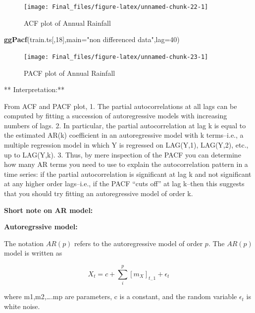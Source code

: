 \documentclass[12pt,openany]{book}
\newenvironment{Shaded}{\begin{snugshade}}{\end{snugshade}}
\newcommand{\DataTypeTok}[1]{\textcolor[rgb]{0.13,0.29,0.53}{#1}}
\newcommand{\DecValTok}[1]{\textcolor[rgb]{0.00,0.00,0.81}{#1}}
\newcommand{\KeywordTok}[1]{\textcolor[rgb]{0.13,0.29,0.53}{\textbf{#1}}}
\newcommand{\NormalTok}[1]{#1}
\newcommand{\StringTok}[1]{\textcolor[rgb]{0.31,0.60,0.02}{#1}}
\begin{document}
\begin{figure}

{\centering \texttt{[image: Final\_files/figure-latex/unnamed-chunk-22-1]} 

}

\caption{ACF plot of Annual Rainfall}\label{fig:unnamed-chunk-22}
\end{figure}

\begin{Shaded}
\begin{Highlighting}[]
\KeywordTok{ggPacf}\NormalTok{(train.ts[,}\DecValTok{18}\NormalTok{],}\DataTypeTok{main=}\StringTok{"non differenced data"}\NormalTok{,}\DataTypeTok{lag=}\DecValTok{40}\NormalTok{)}
\end{Highlighting}
\end{Shaded}

\begin{figure}

{\centering \texttt{[image: Final\_files/figure-latex/unnamed-chunk-23-1]} 

}

\caption{PACF plot of Annual Rainfall}\label{fig:unnamed-chunk-23}
\end{figure}

** Interpretation:**

From ACF and PACF plot,
1. The partial autocorrelations at all lags can be computed by fitting a succession of autoregressive models with increasing numbers of lags.
2. In particular, the partial autocorrelation at lag k is equal to the estimated AR(k) coefficient in an autoregressive model with k terms--i.e., a multiple regression model in which Y is regressed on LAG(Y,1), LAG(Y,2), etc., up to LAG(Y,k).
3. Thus, by mere inspection of the PACF you can determine how many AR terms you need to use to explain the autocorrelation pattern in a time series: if the partial autocorrelation is significant at lag k and not significant at any higher order lags--i.e., if the PACF ``cuts off'' at lag k--then this suggests that you should try fitting an autoregressive model of order k.

\textbf{Short note on AR model:}

\textbf{Autoregrssive model:}

The notation \(AR(p)\) refers to the autoregressive model of order \(p\). The \(AR(p)\) model is written as

\[X_t  = c + \sum_i^p[m _X]_{t_-1} +  \epsilon_t\]

where m1,m2,\ldots{}.mp are parameters, c is a constant, and the random variable \(\epsilon_t\) is white noise.
\end{document}
